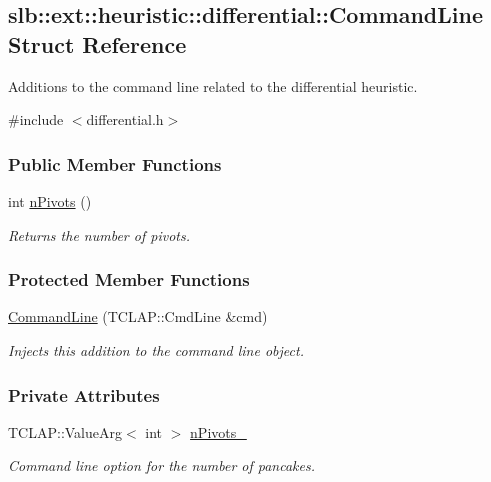 \hypertarget{structslb_1_1ext_1_1heuristic_1_1differential_1_1CommandLine}{}\subsection{slb\+:\+:ext\+:\+:heuristic\+:\+:differential\+:\+:Command\+Line Struct Reference}
\label{structslb_1_1ext_1_1heuristic_1_1differential_1_1CommandLine}


Additions to the command line related to the differential heuristic.  




{\ttfamily \#include $<$differential.\+h$>$}

\subsubsection*{Public Member Functions}
\begin{DoxyCompactItemize}
\item 
int \hyperlink{structslb_1_1ext_1_1heuristic_1_1differential_1_1CommandLine_a17659f8348093e663b2eb1c3fcb986a2}{n\+Pivots} ()
\begin{DoxyCompactList}\small\item\em Returns the number of pivots. \end{DoxyCompactList}\end{DoxyCompactItemize}
\subsubsection*{Protected Member Functions}
\begin{DoxyCompactItemize}
\item 
\hyperlink{structslb_1_1ext_1_1heuristic_1_1differential_1_1CommandLine_aafcf3cdd0b29a6f38d6f79bb63b407e2}{Command\+Line} (T\+C\+L\+A\+P\+::\+Cmd\+Line \&cmd)
\begin{DoxyCompactList}\small\item\em Injects this addition to the command line object. \end{DoxyCompactList}\end{DoxyCompactItemize}
\subsubsection*{Private Attributes}
\begin{DoxyCompactItemize}
\item 
T\+C\+L\+A\+P\+::\+Value\+Arg$<$ int $>$ \hyperlink{structslb_1_1ext_1_1heuristic_1_1differential_1_1CommandLine_ad4bbe83d50e6ec452141b01100e4de48}{n\+Pivots\+\_\+}\hypertarget{structslb_1_1ext_1_1heuristic_1_1differential_1_1CommandLine_ad4bbe83d50e6ec452141b01100e4de48}{}\label{structslb_1_1ext_1_1heuristic_1_1differential_1_1CommandLine_ad4bbe83d50e6ec452141b01100e4de48}

\begin{DoxyCompactList}\small\item\em Command line option for the number of pancakes. \end{DoxyCompactList}\end{DoxyCompactItemize}


